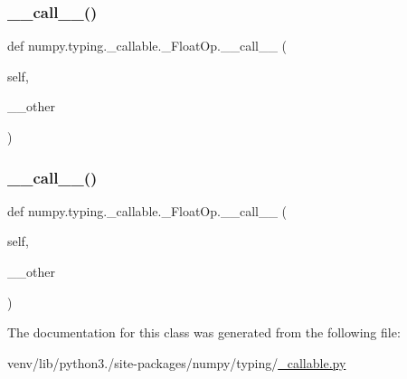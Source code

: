 \subsubsection{\texorpdfstring{\+\_\+\+\_\+call\+\_\+\+\_\+()}{\_\_call\_\_()}\hspace{0.1cm}{\footnotesize\ttfamily [4/5]}}
{\footnotesize\ttfamily def numpy.\+typing.\+\_\+callable.\+\_\+\+Float\+Op.\+\_\+\+\_\+call\+\_\+\+\_\+ (\begin{DoxyParamCaption}\item[{}]{self,  }\item[{}]{\+\_\+\+\_\+other }\end{DoxyParamCaption})}

\mbox{\label{classnumpy_1_1typing_1_1__callable_1_1__FloatOp_a8a2f2403c3efbe6fbab017e5e931dea5}} 
\subsubsection{\texorpdfstring{\+\_\+\+\_\+call\+\_\+\+\_\+()}{\_\_call\_\_()}\hspace{0.1cm}{\footnotesize\ttfamily [5/5]}}
{\footnotesize\ttfamily def numpy.\+typing.\+\_\+callable.\+\_\+\+Float\+Op.\+\_\+\+\_\+call\+\_\+\+\_\+ (\begin{DoxyParamCaption}\item[{}]{self,  }\item[{}]{\+\_\+\+\_\+other }\end{DoxyParamCaption})}



The documentation for this class was generated from the following file\+:\begin{DoxyCompactItemize}
\item 
venv/lib/python3./site-\/packages/numpy/typing/\hyperlink{__callable_8py}{\+\_\+callable.\+py}\end{DoxyCompactItemize}
